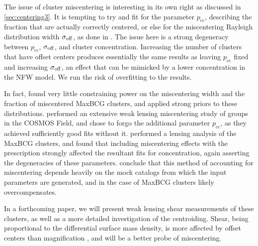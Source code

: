 The issue of cluster miscentering is interesting in its own right as discussed in \autoref{sec:centering3}. It is tempting to try and fit for the parameter $p_{\mathrm{cc}}$, describing the fraction that are actually correctly centered, or else for the miscentering Rayleigh distribution width $\sigma_{\rm{off}}$, as done in \citet{Johnston07}. The issue here is a strong degeneracy between $p_{\mathrm{cc}}$, $\sigma_{\rm{off}}$, and cluster concentration. Increasing the number of clusters that have offset centers produces essentially the same results as leaving $p_{\mathrm{cc}}$ fixed and increasing $\sigma_{\rm{off}}$, an effect that can be mimicked by a lower concentration in the \ac{NFW} model. We run the risk of overfitting to the results. 

In fact, \citet{Johnston07} found very little constraining power on the miscentering width and the fraction of miscentered MaxBCG clusters, and applied strong priors to these distributions. \citet{George12} performed an extensive weak lensing miscentering study of groups in the \ac{COSMOS} Field, and chose to forgo the additional parameter $p_{\mathrm{cc}}$, as they achieved sufficiently good fits without it. \citet{Mandelbaum08b} performed a lensing analysis of the MaxBCG clusters, and found that including miscentering effects with the \citet{Johnston07} prescription strongly affected the resultant fits for concentration, again asserting the degeneracies of these parameters. \citet{Mandelbaum08b} conclude that this method of accounting for miscentering depends heavily on the mock catalogs from which the input parameters are generated, and in the case of MaxBCG clusters likely overcompensates. 

In a forthcoming paper, we will present weak lensing shear measurements of these clusters, as well as a more detailed investigation of the centroiding. Shear, being proportional to the differential surface mass density, is more affected by offset centers than magnification \citep{Johnston07}, and will be a better probe of miscentering.




